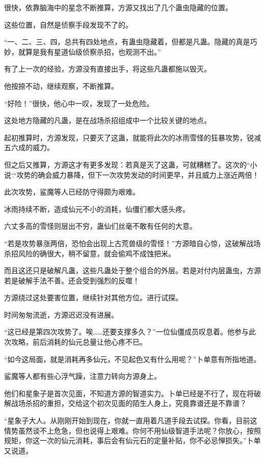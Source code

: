 
\begin{this_body}

很快，依靠脑海中的星念不断推算，方源又找出了几个蛊虫隐藏的位置。

这些位置，自然是侦察手段发现不了的。

“一、二、三、四，总共有四处地点，有蛊虫隐藏着，但都是凡蛊。隐藏的真是巧妙，就算是我有星道仙级侦察杀招，也观测不出。”

有了上一次的经验，方源没有直接出手，将这些凡蛊都施以毁灭。

他按捺不动，继续观察，不断推算。

“好险！”很快，他心中一叹，发现了一处危险。

这处地方隐藏的凡蛊，是在战场杀招组成中一个比较关键的地点。

起初推算时，方源发现，只要灭了这蛊，就能将此次的冰雨雪怪的狂暴攻势，锐减五六成的威力。

但之后又推算，方源这才有更多发现：若真是灭了这蛊，可就糟糕了。这次的``小说`.``攻势的确会威力暴降，但下一次攻势发动的时间更早，并且威力上涨近两倍！

此次攻势，鲨魔等人已经防守得颇为艰难。

冰雨持续不断，造成仙元不小的消耗，仙僵们都大感头疼。

六丈多高的雪怪则层出不穷，蛊仙们丝毫不敢有任何的大意。

“若是攻势暴涨两倍，恐怕会出现上古荒兽级的雪怪！”方源暗自心惊，这破解战场杀招风险的确很大，稍不留意，就会偷鸡不成蚀把米。

而且这还只是破解凡蛊，这些凡蛊处于整个组合的外层。若是对付内层蛊虫，方源若是破解手法不善。还会受到强烈的反噬！

方源绕过这处要害位置，继续针对其他方位。进行试探。

时间匆匆流逝，方源迟迟没有进展。

“这已经是第四次攻势了。唉……还要支撑多久？”一位仙僵成员叹息着。他参与此次攻略，前后消耗的仙元总量让他心疼不已。

“如今这局面，就是消耗再多仙元，不见起色又有什么用呢？”卜单意有所指地道。

鲨魔等人都有些心浮气躁，注意力转向方源身上。

他们和星象子是首次见面，不知道方源的智道实力。卜单已经是不行了，现在将破解战场杀招的重担，交给这个初次见面的陌生人身上，究竟靠谱还是不靠谱？

“星象子大人。从刚刚开始到现在，你就一直用着凡道手段去试探。你看，目前这情势虽然谈不上危急，但也说得上艰难。你何不用仙级智道手法呢？你放心，按照规矩，你这一次的仙元消耗，事后会有仙元石的定量补贴，你不必忌惮损失。”卜单又说道。


\end{this_body}

